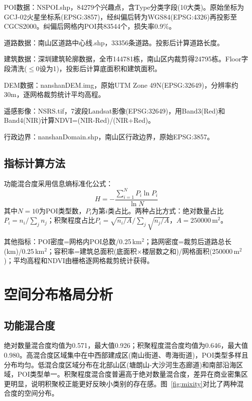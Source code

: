 \documentclass[conference]{IEEEtran}
\begin{document}
POI数据：NSPOI.shp，84279个兴趣点，含Type分类字段(10大类)。原始坐标为GCJ-02火星坐标系(EPSG:3857)，经纠偏后转为WGS84(EPSG:4326)再投影至CGCS2000。纠偏后网格内POI共83544个，损失率0.9\%。

道路数据：南山区道路中心线.shp，33356条道路。投影后计算道路长度。

建筑数据：深圳建筑轮廓数据，全市144781栋，南山区内裁剪得24795栋。Floor字段清洗($\leq 0$设为1)，投影后计算底面积和建筑面积。

DEM数据：nanshanDEM.img，原始UTM Zone 49N(EPSG:32649)，分辨率约30m，逐网格裁剪统计平均高程。

遥感影像：NSRS.tif，7波段Landsat影像(EPSG:32649)，用Band3(Red)和Band4(NIR)计算NDVI=(NIR-Red)/(NIR+Red)。

行政边界：nanshanDomain.shp，南山区行政边界，原始EPSG:3857。

\subsection{指标计算方法}

功能混合度采用信息熵标准化公式：
\begin{equation}
H = -\frac{\sum_{i=1}^{N} P_i \ln P_i}{\ln N}
\end{equation}
其中$N=10$为POI类型数，$P_i$为第$i$类占比。两种占比方式：绝对数量占比$P_i = n_i / \sum_j n_j$；积聚程度占比$P_i = \sqrt{n_i/A} / \sum_j \sqrt{n_j/A}$，$A=250000$\,m$^2$。

其他指标：POI密度=网格内POI总数/0.25\,km$^2$；路网密度=裁剪后道路总长(km)/0.25\,km$^2$；容积率=建筑总面积(底面积$\times$楼层数之和)/网格面积(250000\,m$^2$)；平均高程和NDVI由栅格逐网格裁剪统计获得。

\section{空间分布格局分析}

\subsection{功能混合度}

绝对数量混合度均值为0.571，最大值0.926；积聚程度混合度均值为0.646，最大值0.980。高混合度区域集中在中西部建成区(南山街道、粤海街道)，POI类型多样且分布均匀。低混合度区域分布在北部山区(塘朗山-大沙河生态廊道)和南部沿海区域，POI类型单一。积聚程度混合度普遍高于绝对数量混合度，差异在商业密集区更明显，说明积聚校正能更好反映小类别的存在感。图~\ref{fig:mixity}对比了两种混合度的空间分布。
\end{document}
